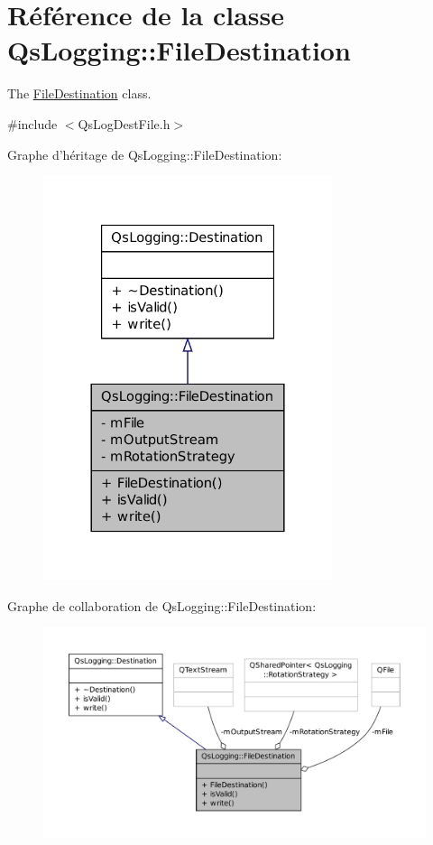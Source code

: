 \hypertarget{classQsLogging_1_1FileDestination}{\section{Référence de la classe Qs\-Logging\-:\-:File\-Destination}
\label{classQsLogging_1_1FileDestination}
}


The \hyperlink{classQsLogging_1_1FileDestination}{File\-Destination} class.  




{\ttfamily \#include $<$Qs\-Log\-Dest\-File.\-h$>$}



Graphe d'héritage de Qs\-Logging\-:\-:File\-Destination\-:
\nopagebreak
\begin{figure}[H]
\begin{center}
\leavevmode
\includegraphics[width=240pt]{classQsLogging_1_1FileDestination__inherit__graph}
\end{center}
\end{figure}


Graphe de collaboration de Qs\-Logging\-:\-:File\-Destination\-:
\nopagebreak
\begin{figure}[H]
\begin{center}
\leavevmode
\includegraphics[width=350pt]{classQsLogging_1_1FileDestination__coll__graph}
\end{center}
\end{figure}
